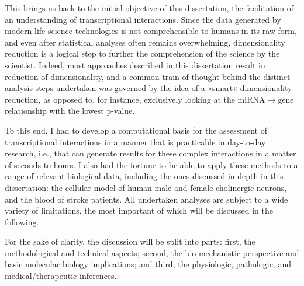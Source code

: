 This brings us back to the initial objective of this dissertation, the facilitation of an understanding of transcriptional interactions. Since the data generated by modern life-science technologies is not comprehensible to humans in its raw form, and even after statistical analyses often remains overwhelming, dimensionality reduction is a logical step to further the comprehension of the science by the scientist. Indeed, most approaches described in this dissertation result in reduction of dimensionality, and a common train of thought behind the distinct analysis steps undertaken was governed by the idea of a »smart« dimensionality reduction, as opposed to, for instance, exclusively looking at the miRNA$\to$gene relationship with the lowest p-value.

To this end, I had to develop a computational basis for the assessment of transcriptional interactions in a manner that is practicable in day-to-day research, i.e., that can generate results for these complex interactions in a matter of seconds to hours. I also had the fortune to be able to apply these methods to a range of relevant biological data, including the ones discussed in-depth in this dissertation: the cellular model of human male and female cholinergic neurons, and the blood of stroke patients. All undertaken analyses are subject to a wide variety of limitations, the most important of which will be discussed in the following.

For the sake of clarity, the discussion will be split into parts: first, the methodological and technical aspects; second, the bio-mechanistic perspective and basic molecular biology implications; and third, the physiologic, pathologic, and medical/therapeutic inferences.



